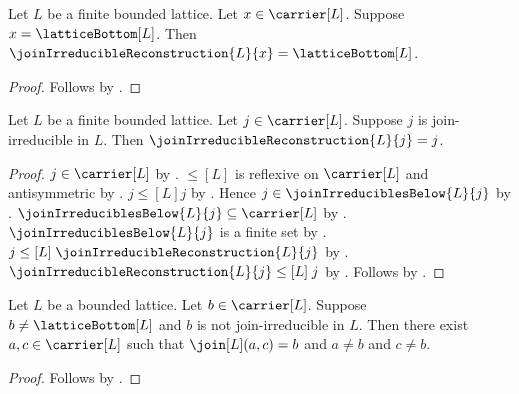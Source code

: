 \begin{proposition}\label{join_irreducible_reconstruction_lattice_bottom}
    Let $L$ be a finite bounded lattice.
    Let $x\in\carrier[L]$.
    Suppose $x=\latticeBottom[L]$.
    Then $\joinIrreducibleReconstruction{L}{x}=\latticeBottom[L]$.
\end{proposition}
\begin{proof}
    Follows by
        .
\end{proof}

\begin{proposition}\label{join_irreducible_reconstruction_eq_self}
    Let $L$ be a finite bounded lattice.
    Let $j\in\carrier[L]$.
    Suppose $j$ is join-irreducible in $L$.
    Then $\joinIrreducibleReconstruction{L}{j}=j$.
\end{proposition}
\begin{proof}
    $j\in\carrier[L]$ by .
    $\leq[L]$ is reflexive on $\carrier[L]$ and antisymmetric by
        .
    $j\mathrel{\leq[L]}j$ by .
    Hence $j\in\joinIrreduciblesBelow{L}{j}$ by
        .
    $\joinIrreduciblesBelow{L}{j}\subseteq\carrier[L]$ by
        .
    $\joinIrreduciblesBelow{L}{j}$ is a finite set by
        .
    $j\mathrel{\leq[L]}\joinIrreducibleReconstruction{L}{j}$ by
        .
    $\joinIrreducibleReconstruction{L}{j}\mathrel{\leq[L]}j$ by
        .
    Follows by .
\end{proof}

\begin{proposition}\label{not_join_irreducible_witness}
    Let $L$ be a bounded lattice.
    Let $b\in\carrier[L]$.
    Suppose $b\neq\latticeBottom[L]$ and
        $b$ is not join-irreducible in $L$.
    Then there exist $a,c\in\carrier[L]$ such that
        $\join[L](a,c)=b$ and $a\neq b$ and $c\neq b$.
\end{proposition}
\begin{proof}
    Follows by .
\end{proof}

